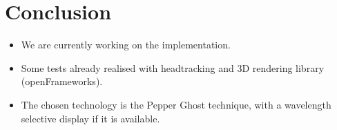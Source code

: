 \section{Conclusion}
\begin{frame}
  \begin{itemize}
  \item We are currently working on the implementation.
  \item Some tests already realised with headtracking and 3D rendering library (openFrameworks).
  \item The chosen technology is the Pepper Ghost technique, with a wavelength selective display if it is available.
  \end{itemize}
\end{frame}
